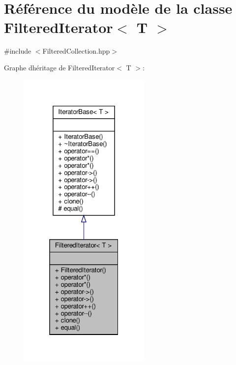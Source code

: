 \hypertarget{class_filtered_iterator}{}\section{Référence du modèle de la classe Filtered\+Iterator$<$ T $>$}
\label{class_filtered_iterator}


{\ttfamily \#include $<$Filtered\+Collection.\+hpp$>$}



Graphe d\textquotesingle{}héritage de Filtered\+Iterator$<$ T $>$\+:\nopagebreak
\begin{figure}[H]
\begin{center}
\leavevmode
\includegraphics[width=184pt]{class_filtered_iterator__inherit__graph}
\end{center}
\end{figure}


